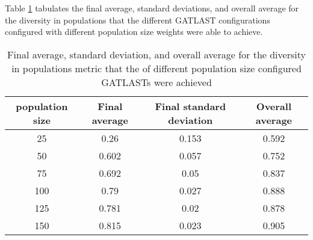 Table \ref{tab:HP:GA:populationSize:diversity in populations} tabulates the final average, standard deviations, and overall average for the diversity in populations that the different GATLAST configurations configured with different population size weights were able to achieve.
\begin{table}[tbh!]
\centering
\begin{adjustbox}{trim=0cm 0cm 0cm 0cm, clip=true}
\begin{tabular}{|c|c|c|c|}
\hline
population size & Final average & Final standard deviation & Overall average\\
\hline
25 & 0.26 & 0.153 & 0.592\\\hline
50 & 0.602 & 0.057 & 0.752\\\hline
75 & 0.692 & 0.05 & 0.837\\\hline
100 & 0.79 & 0.027 & 0.888\\\hline
125 & 0.781 & 0.02 & 0.878\\\hline
150 & 0.815 & 0.023 & 0.905\\\hline
\end{tabular}
\end{adjustbox}
\caption{Final average, standard deviation, and overall average for the diversity in populations metric that the of different population size configured GATLASTs were achieved}
\label{tab:HP:GA:populationSize:diversity in populations}
\end{table}